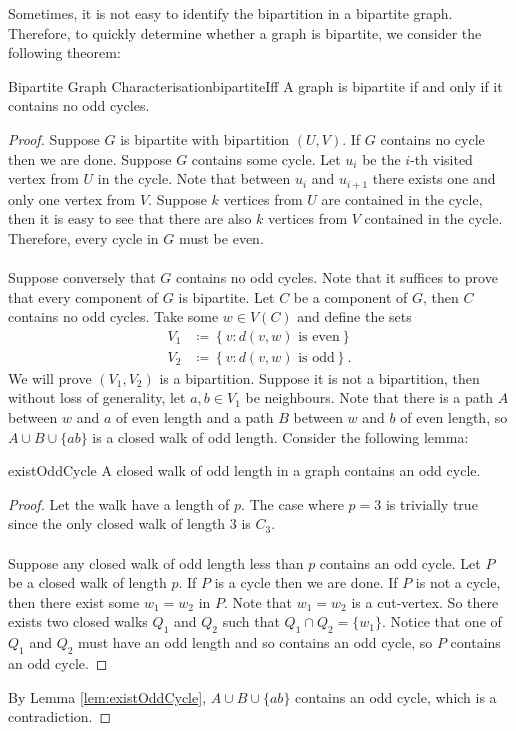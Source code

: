 \documentclass[math, code]{amznotes}
\theoremstyle{remark}
\begin{document}
Sometimes, it is not easy to identify the bipartition in a bipartite graph. Therefore, to quickly determine whether a graph is bipartite, we consider the following theorem:
\begin{thmbox}{Bipartite Graph Characterisation}{bipartiteIff}
    A graph is bipartite if and only if it contains no odd cycles.
    \tcblower
    \begin{proof}
        Suppose $G$ is bipartite with bipartition $(U, V)$. If $G$ contains no cycle then we are done. Suppose $G$ contains some cycle. Let $u_i$ be the $i$-th visited vertex from $U$ in the cycle. Note that between $u_i$ and $u_{i + 1}$ there exists one and only one vertex from $V$. Suppose $k$ vertices from $U$ are contained in the cycle, then it is easy to see that there are also $k$ vertices from $V$ contained in the cycle. Therefore, every cycle in $G$ must be even.
        \\\\
        Suppose conversely that $G$ contains no odd cycles. Note that it suffices to prove that every component of $G$ is bipartite. Let $C$ be a component of $G$, then $C$ contains no odd cycles. Take some $w \in V(C)$ and define the sets
        \begin{align*}
            V_1 & \coloneqq \left\{v \colon d(v, w) \textrm{ is even}\right\} \\
            V_2 & \coloneqq \left\{v \colon d(v, w) \textrm{ is odd}\right\}.
        \end{align*}
        We will prove $(V_1, V_2)$ is a bipartition. Suppose it is not a bipartition, then without loss of generality, let $a, b \in V_1$ be neighbours. Note that there is a path $A$ between $w$ and $a$ of even length and a path $B$ between $w$ and $b$ of even length, so $A \cup B \cup \{ab\}$ is a closed walk of odd length. Consider the following lemma:
        \begin{lembox}{}{existOddCycle}
            A closed walk of odd length in a graph contains an odd cycle.
            \tcblower
            \begin{proof}
                Let the walk have a length of $p$. The case where $p = 3$ is trivially true since the only closed walk of length $3$ is $C_3$. 
                \\\\
                Suppose any closed walk of odd length less than $p$ contains an odd cycle. Let $P$ be a closed walk of length $p$. If $P$ is a cycle then we are done. If $P$ is not a cycle, then there exist some $w_1 = w_2$ in $P$. Note that $w_1 = w_2$ is a cut-vertex. So there exists two closed walks $Q_1$ and $Q_2$ such that $Q_1 \cap Q_2 = \{w_1\}$. Notice that one of $Q_1$ and $Q_2$ must have an odd length and so contains an odd cycle, so $P$ contains an odd cycle.
            \end{proof}
        \end{lembox}
        By Lemma \ref{lem:existOddCycle}, $A \cup B \cup \{ab\}$ contains an odd cycle, which is a contradiction. 
    \end{proof}
\end{thmbox}
\end{document}
